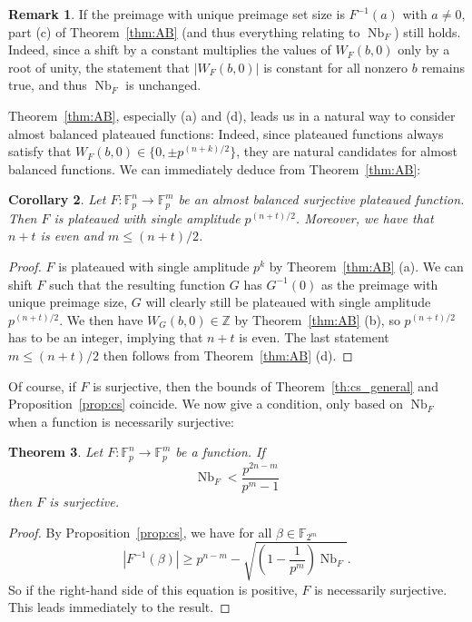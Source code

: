 \documentclass[11pt]{article}
\newcommand{\Z}{\mathbb Z}
\newcommand{\F}{\mathbb F}
\DeclareMathOperator{\Nb}{Nb}
\theoremstyle{plain}
\newtheorem{theorem}{Theorem}[section]
\newtheorem{corollary}[theorem]{Corollary}
\theoremstyle{definition}
\newtheorem{remark}[theorem]{Remark}
\numberwithin{theorem}{section}
\numberwithin{equation}{section}
\numberwithin{table}{section}
\numberwithin{figure}{section}
\begin{document}
{\begin{remark}
    If the preimage with unique preimage set size is $F^{-1}(a)$ with $a \neq 0$, part (c) of Theorem~\ref{thm:AB} (and thus everything relating to $\Nb_F$) still holds. Indeed, since a shift by a constant multiplies the values of $W_F(b,0)$ only by a root of unity, the statement that $|W_F(b,0)|$ is constant for all nonzero $b$ remains true, and thus $\Nb_F$ is unchanged.
\end{remark}

Theorem~\ref{thm:AB}, especially (a) and (d), leads us in a natural way to consider almost balanced plateaued functions: Indeed, since plateaued functions always satisfy that $W_F(b,0) \in \{0,\pm p^{(n+k)/2}\}$, they are natural candidates for almost balanced functions. We can immediately deduce from Theorem~\ref{thm:AB}:
\begin{corollary}
    Let $F\colon \F_p^n \rightarrow \F_p^m$ be an almost balanced surjective plateaued function. Then $F$ is plateaued with single amplitude $p^{(n+t)/2}$. Moreover, we have that $n+t$ is even and $m\leq (n+t)/2$. 
\end{corollary}
\begin{proof}
    $F$ is plateaued with single amplitude $p^k$ by Theorem~\ref{thm:AB} (a). We can shift $F$ such that the resulting function $G$ has $G^{-1}(0)$ as the preimage with unique preimage size, $G$ will clearly still be plateaued with single amplitude $p^{(n+t)/2}$. We then have $W_G(b,0)\in\Z$ by Theorem~\ref{thm:AB} (b), so $p^{(n+t)/2}$ has to be an integer, implying that $n+t$ is even. The last statement $m\leq (n+t)/2$ then follows from Theorem~\ref{thm:AB} (d).
\end{proof}

Of course, if $F$ is surjective, then the bounds of Theorem~\ref{th:cs_general} and Proposition~\ref{prop:cs} coincide. We now give a condition, only based on $\Nb_F$ when a function is necessarily surjective:
\begin{theorem} \label{thm:surj}
    Let $F \colon \F_{p}^n \rightarrow \F_{p}^m$ be a function. If {
    \[\Nb_F <\frac{p^{2n-m}}{p^m-1}\]
    }then $F$ is surjective.
\end{theorem}
\begin{proof}
    By Proposition~\ref{prop:cs}, we have for all $\beta \in \F_{2^m}$
    \[ |F^{-1}(\beta)| \geq p^{n-m}-\sqrt{\left(1-\frac{1}{p^m}\right)\Nb_F}.\]
    So if the right-hand side of this equation is positive, $F$ is necessarily surjective. This leads immediately to the result.
\end{proof}

}
\end{document}
